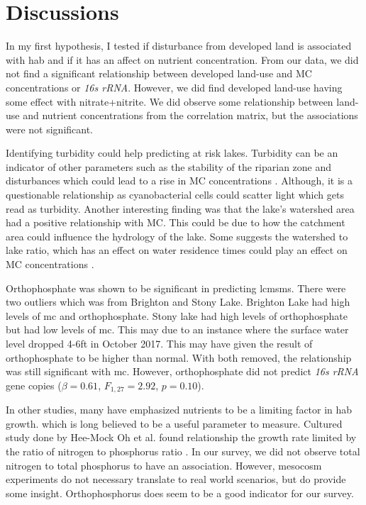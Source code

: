 \section{Discussions}

In my first hypothesis, I tested if disturbance from developed land is associated with \gls{hab} and if it has an affect on nutrient concentration.  From our data, we did not find a significant relationship between developed land-use and MC concentrations or \emph{16s rRNA}. However, we did find developed land-use having some effect with nitrate+nitrite. We did observe some relationship between land-use and nutrient concentrations from the correlation matrix, but the associations were not significant.

Identifying turbidity could help predicting at risk lakes. Turbidity can be an indicator of other parameters such as the stability of the riparian zone and disturbances which could lead to a rise in MC concentrations \cite{taranu_predicting_2017}. Although, it is a questionable relationship as cyanobacterial cells could scatter light which gets read as turbidity. Another interesting finding was that the lake's watershed area had a positive relationship with MC. This could be due to how the catchment area could influence the hydrology of the lake. Some suggests the watershed to lake ratio, which has an effect on water residence times could play an effect on MC concentrations \cite{taranu_predicting_2017, fraterrigo_influence_2008}. 

Orthophosphate was shown to be significant in predicting \gls{lcmsms}. There were two outliers which was from Brighton and Stony Lake. Brighton Lake had high levels of \gls{mc} and orthophosphate. Stony lake had high levels of orthophosphate but had low levels of \gls{mc}. This may due to an instance where the surface water level dropped 4-6ft in October 2017. This may have given the result of orthophosphate to be higher than normal. With both removed, the relationship was still significant with \gls{mc}. However, orthophosphate did not predict \emph{16s rRNA} gene copies ($\beta=0.61$, $F_{{1,27}}=2.92$, $p=0.10$).

In other studies, many have emphasized nutrients to be a limiting factor in \gls{hab} growth.  which is long believed to be a useful parameter to measure. Cultured study done by Hee-Mock Oh et al. found relationship the growth rate limited by the ratio of nitrogen to phosphorus ratio \cite{oh_microcystin_2000}. In our survey, we did not observe total nitrogen to total phosphorus to have an association. However, mesocosm experiments do not necessary translate to real world scenarios, but do provide some insight. Orthophosphorus does seem to be a good indicator for our survey. 

